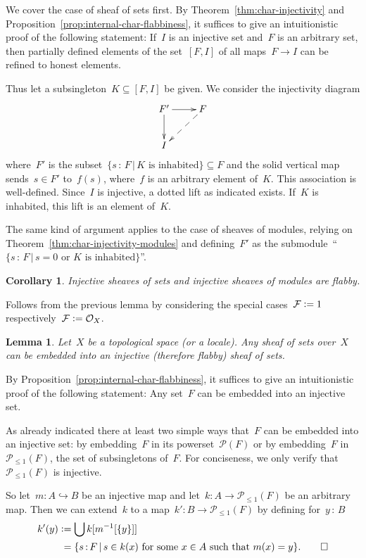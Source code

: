 \documentclass[10pt,reqno,a4paper]{amsbook}
\makeatletter
\theoremstyle{definition}
\theoremstyle{plain}
\newtheorem{cor}[defn]{Corollary}
\newtheorem{lemma}[defn]{Lemma}
\theoremstyle{remark}
\newcommand{\F}{\mathcal{F}}
\renewcommand{\O}{\mathcal{O}}
\renewcommand{\P}{\mathcal{P}}
\newcommand{\?}{\,{:}\,}
\renewcommand{\_}{\mathpunct{.}\,}
\newcommand{\defeq}{\vcentcolon=}
\renewenvironment{proof}[1][\proofname]{\par
  \pushQED{\qed}%
  \normalfont \topsep6\p@\@plus6\p@\relax
  \trivlist
  \item[\hskip\labelsep
        \itshape
    #1\@addpunct{.}]\ignorespaces
}{%
  \popQED\endtrivlist\@endpefalse
}
\makeatother
\begin{document}
\begin{proof}
We cover the case of sheaf of sets first. By Theorem~\ref{thm:char-injectivity}
and Proposition~\ref{prop:internal-char-flabbiness}, it suffices to give an
intuitionistic proof of the following statement: If~$I$ is an injective set
and~$F$ is an arbitrary set, then partially defined elements of the set~$[F,I]$
of all maps~$F \to I$ can be refined to honest elements.

Thus let a subsingleton~$K \subseteq [F,I]$ be given. We consider the
injectivity diagram
\[ \xymatrix{
  F' \ar[r]\ar[d] & F \ar@{-->}[ld] \\
  I
} \]
where~$F'$ is the subset~$\{ s \? F \,|\, \text{$K$ is inhabited} \} \subseteq F$ and the
solid vertical map sends~$s \in F'$ to~$f(s)$, where~$f$ is an arbitrary element
of~$K$. This association is well-defined. Since~$I$ is injective, a dotted lift
as indicated exists. If~$K$ is inhabited, this lift is an element of~$K$.

The same kind of argument applies to the case of sheaves of modules, relying on
Theorem~\ref{thm:char-injectivity-modules} and defining~$F'$ as the
submodule~``$\{ s \? F \,|\, \text{$s = 0$ or $K$ is inhabited} \}$''.
\end{proof}

\begin{cor}Injective sheaves of sets and injective sheaves of modules are
flabby.\end{cor}

\begin{proof}Follows from the previous lemma by considering the special cases~$\F
\defeq 1$ respectively~$\F \defeq \O_X$.\end{proof}

\begin{lemma}\label{lemma:enough-flabby}
Let~$X$ be a topological space (or a locale). Any sheaf of sets
over~$X$ can be embedded into an injective (therefore flabby) sheaf of sets.
\end{lemma}

\begin{proof}By Proposition~\ref{prop:internal-char-flabbiness}, it suffices to
give an intuitionistic proof of the following statement: Any set~$F$ can be
embedded into an injective set.

As already indicated there at least two simple ways that~$F$ can be embedded
into an injective set: by embedding~$F$ in its powerset~$\P(F)$ or by
embedding~$F$ in~$\P_{\leq1}(F)$, the set of subsingletons of~$F$. For
conciseness, we only verify that~$\P_{\leq1}(F)$ is injective.

So let~$m : A \hookrightarrow B$ be an injective map and let~$k : A \to
\P_{\leq1}(F)$ be an arbitrary map. Then we can extend~$k$ to a map~$k' : B \to
\P_{\leq1}(F)$ by defining for~$y \? B$
\begin{align*}
  k'(y) &\defeq \bigcup k[m^{-1}[\{y\}]] \\
  &\phantom{\vcentcolon}= \{ s\?F \,|\, \text{$s \in k(x)$ for some~$x \in A$ such that~$m(x) = y$} \}.
  \qedhere
\end{align*}
\end{proof}
\end{document}
